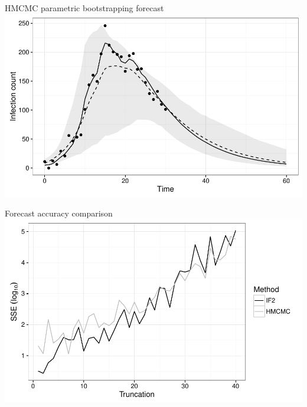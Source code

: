 \documentclass[12pt]{beamer}
\begin{document}
\begin{frame}

	\null
	\vfill
	HMCMC parametric bootstrapping forecast \\
	\vspace{\baselineskip}
	\includegraphics[width=\textwidth,height=\textheight,keepaspectratio=true]{../../writing/SC2/images/hmcforecast}
	\vfill

\end{frame}

\begin{frame}

	\null
	\vfill
	Forecast accuracy comparison \\
	\vspace{\baselineskip}
	\includegraphics[width=\textwidth,height=\textheight,keepaspectratio=true]{../../writing/SC2/images/truncation}
	\vfill

\end{frame}
\end{document}
